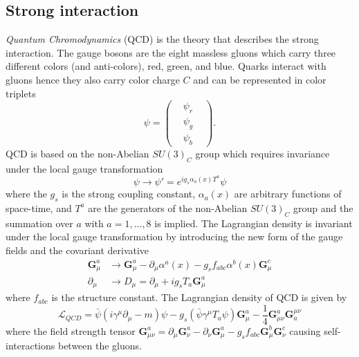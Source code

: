 \subsection{Strong interaction}
\label{subsec:sm_strong_interaction}
\textit{Quantum Chromodynamics} (QCD) is the theory that describes the strong interaction.
The gauge bosons are the eight massless gluons which carry three different colors (and anti-colors), red, green, and blue.
Quarks interact with gluons hence they also carry color charge $C$ and can be represented in color triplets
%
\begin{equation}
    \psi = 
    \left(
        \begin{matrix}
            & \psi_{r} & \\
            & \psi_{g} & \\
            & \psi_{b} &
        \end{matrix}
    \right).
    \label{eq:sm_quark_triplets}
\end{equation}
%
QCD is based on the non-Abelian $SU(3)_{C}$ group which requires invariance under the local gauge transformation
%
\begin{equation}
    \psi \rightarrow \psi' = e^{i g_{s} \alpha_{a}(x) T^{a}}\psi
    \label{eq:sm_qcd_gauge_transformation_1}
\end{equation}
%
where the $g_{s}$ is the strong coupling constant, $\alpha_{a}(x)$ are arbitrary functions of space-time, and $T^{a}$ are the generators of the non-Abelian $SU(3)_{C}$ group and the summation over $a$ with $a = 1, \dots, 8$ is implied.
The Lagrangian density is invariant under the local gauge transformation by introducing the new form of the gauge fields and the covariant derivative
%
\begin{align}
    \bm{G}_{\mu}^{a} & \rightarrow \bm{G}_{\mu}^{a} -  \partial_{\mu} \alpha^{a}(x) - g_{s} f_{abc} \alpha^{b}(x) \bm{G}_{\mu}^{c} \\
    \partial_{\mu} & \rightarrow D_{\mu} = \partial_{\mu} + i g_{s} T_{a} \bm{G}_{\mu}^{a}
    \label{eq:sm_qcd_gauge_transformation_2}
\end{align}
%
where $f_{abc}$ is the structure constant. 
The Lagrangian density of QCD is given by
%
\begin{equation}
    \mathcal{L}_{QCD} = \bar{\psi}(i \gamma^{\mu} \partial_{\mu} - m) \psi - g_{s} ( \bar{\psi} \gamma^{\mu} T_{a} \psi) \bm{G}_{\mu}^{a} - \frac{1}{4} \bm{G}_{\mu\nu}^{a} \bm{G}_{a}^{\mu\nu}
    \label{eq:sm_qcd_lagrangian}
\end{equation}
%
where the field strength tensor $\bm{G}_{\mu\nu}^{a} = \partial_{\mu} \bm{G}_{\nu}^{a} - \partial_{\nu} \bm{G}_{\mu}^{a} - g_{s} f_{abc} \bm{G}_{\mu}^{b} \bm{G}_{\nu}^{c}$ causing self-interactions between the gluons.
